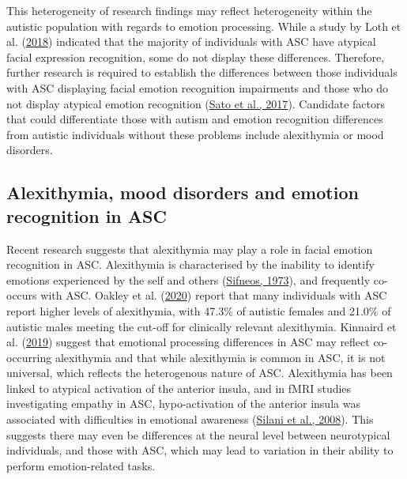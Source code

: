 \documentclass[
]{article}
\begin{document}
This heterogeneity of research findings may reflect heterogeneity within the autistic population with regards to emotion processing. While a study by Loth et al. (\protect\hyperlink{ref-loth2018a}{2018}) indicated that the majority of individuals with ASC have atypical facial expression recognition, some do not display these differences. Therefore, further research is required to establish the differences between those individuals with ASC displaying facial emotion recognition impairments and those who do not display atypical emotion recognition (\protect\hyperlink{ref-sato2017a}{Sato et al., 2017}). Candidate factors that could differentiate those with autism and emotion recognition differences from autistic individuals without these problems include alexithymia or mood disorders.

\hypertarget{alexithymia-mood-disorders-and-emotion-recognition-in-asc}{%
\subsection*{Alexithymia, mood disorders and emotion recognition in ASC}\label{alexithymia-mood-disorders-and-emotion-recognition-in-asc}}

Recent research suggests that alexithymia may play a role in facial emotion recognition in ASC. Alexithymia is characterised by the inability to identify emotions experienced by the self and others (\protect\hyperlink{ref-sifneos1973a}{Sifneos, 1973}), and frequently co-occurs with ASC. Oakley et al. (\protect\hyperlink{ref-oakley2020a}{2020}) report that many individuals with ASC report higher levels of alexithymia, with 47.3\% of autistic females and 21.0\% of autistic males meeting the cut-off for clinically relevant alexithymia. Kinnaird et al. (\protect\hyperlink{ref-kinnaird2019a}{2019}) suggest that emotional processing differences in ASC may reflect co-occurring alexithymia and that while alexithymia is common in ASC, it is not universal, which reflects the heterogenous nature of ASC. Alexithymia has been linked to atypical activation of the anterior insula, and in fMRI studies investigating empathy in ASC, hypo-activation of the anterior insula was associated with difficulties in emotional awareness (\protect\hyperlink{ref-silani2008a}{Silani et al., 2008}). This suggests there may even be differences at the neural level between neurotypical individuals, and those with ASC, which may lead to variation in their ability to perform emotion-related tasks.
\end{document}
